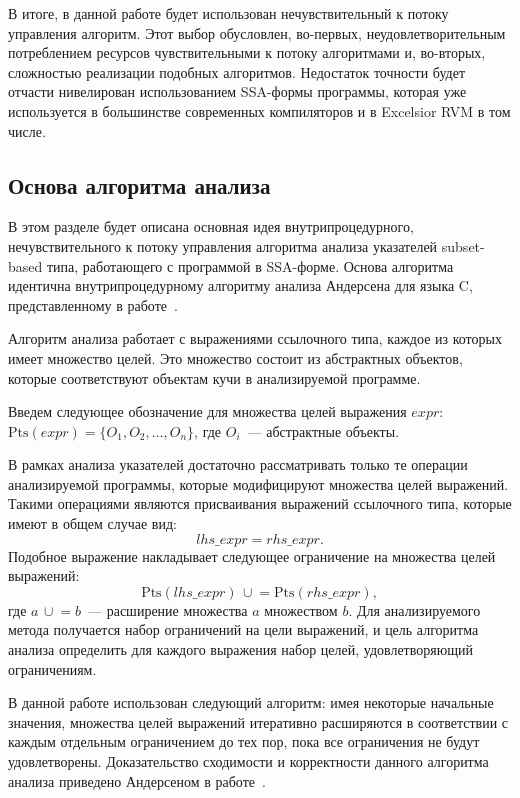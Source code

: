 \documentclass[14pt,titlepage]{extarticle}
\newcommand{\Pts}[1]{\textrm{Pts}(#1)}
\newcommand{\cupe}{\,\cup\!\!=}
\newcommand{\eng}[1]{{\English#1}}
\begin{document}
        В итоге, в данной работе будет использован нечувствительный к потоку
        управления алгоритм. Этот выбор обусловлен, во-первых,
        неудовлетворительным потреблением ресурсов чувствительными к потоку
        алгоритмами и, во-вторых, сложностью реализации подобных алгоритмов.
        Недостаток точности будет отчасти нивелирован использованием SSA-формы
        программы, которая уже используется в большинстве современных
        компиляторов и в \eng{Excelsior RVM} в том числе.

    \subsection{Основа алгоритма анализа}
      \label{section:algorithm_basis}

      В этом разделе будет описана основная идея внутрипроцедурного,
      нечувствительного к потоку управления алгоритма анализа указателей
      \eng{subset-based} типа, работающего с программой в SSA-форме. Основа
      алгоритма идентична внутрипроцедурному алгоритму анализа Андерсена для
      языка C, представленному в работе~\cite{andersen}.

      Алгоритм анализа работает с выражениями ссылочного типа, каждое из
      которых имеет множество целей. Это множество состоит из абстрактных
      объектов, которые соответствуют объектам кучи в анализируемой программе.

      Введем следующее обозначение для множества целей выражения $expr$:
      $\Pts{expr} = \{O_1, O_2, \ldots, O_n\}$, где $O_i$~--- абстрактные объекты.

      В рамках анализа указателей достаточно рассматривать только те операции
      анализируемой программы, которые модифицируют множества целей выражений.
      Такими операциями являются присваивания выражений ссылочного типа,
      которые имеют в общем случае вид:
      \[lhs\_expr = rhs\_expr.\]
      Подобное выражение накладывает следующее ограничение на множества целей
      выражений:
      \[\Pts{lhs\_expr} \cupe \Pts{rhs\_expr},\]
      где $a \cupe b$~--- расширение множества $a$ множеством $b$.
      Для анализируемого метода получается набор ограничений на цели выражений,
      и цель алгоритма анализа определить для каждого выражения набор целей,
      удовлетворяющий ограничениям.

      В данной работе использован следующий алгоритм: имея некоторые
      начальные значения, множества целей выражений итеративно расширяются в
      соответствии с каждым отдельным ограничением до тех пор, пока все
      ограничения не будут удовлетворены. Доказательство сходимости и
      корректности данного алгоритма анализа приведено Андерсеном в
      работе~\cite{andersen}.
\end{document}
